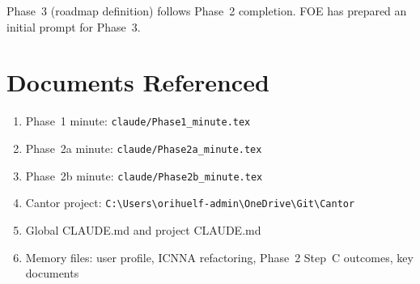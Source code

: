 \documentclass[11pt,a4paper]{article}
\begin{document}
Phase~3 (roadmap definition) follows Phase~2 completion. FOE has prepared an initial prompt for Phase~3.

\section{Documents Referenced}

\begin{enumerate}
    \item Phase~1 minute: \texttt{claude/Phase1\_minute.tex}
    \item Phase~2a minute: \texttt{claude/Phase2a\_minute.tex}
    \item Phase~2b minute: \texttt{claude/Phase2b\_minute.tex}
    \item Cantor project: \texttt{C:\textbackslash Users\textbackslash orihuelf-admin\textbackslash OneDrive\textbackslash Git\textbackslash Cantor}
    \item Global CLAUDE.md and project CLAUDE.md
    \item Memory files: user profile, ICNNA refactoring, Phase~2 Step~C outcomes, key documents
\end{enumerate}
\end{document}
